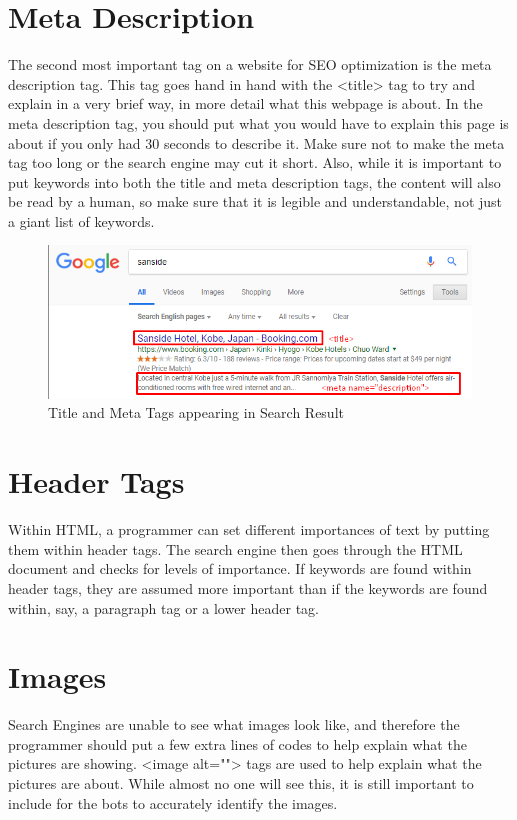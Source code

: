 \documentclass{article}
\begin{document}
\section{Meta Description}
The second most important tag on a website for SEO optimization is the meta description tag. This tag goes hand in hand with the <title> tag to try and explain in a very brief way, in more detail what this webpage is about. In the meta description tag, you should put what you would have to explain this page is about if you only had 30 seconds to describe it. Make sure not to make the meta tag too long or the search engine may cut it short. Also, while it is important to put keywords into both the title and meta description tags, the content will also be read by a human, so make sure that it is legible and understandable, not just a giant list of keywords.

\begin{figure}[h]
\centering
\includegraphics[width=\textwidth]{images/titleandmeta.png}
\caption{Title and Meta Tags appearing in Search Result}
\end{figure}

\section{Header Tags}
Within HTML, a programmer can set different importances of text by putting them within header tags. The search engine then goes through the HTML document and checks for levels of importance. If keywords are found within header tags, they are assumed more important than if the keywords are found within, say, a paragraph tag or a lower header tag. 

\section{Images}
Search Engines are unable to see what images look like, and therefore the programmer should put a few extra lines of codes to help explain what the pictures are showing. <image alt=""> tags are used to help explain what the pictures are about. While almost no one will see this, it is still important to include for the bots to accurately identify the images.
\end{document}
